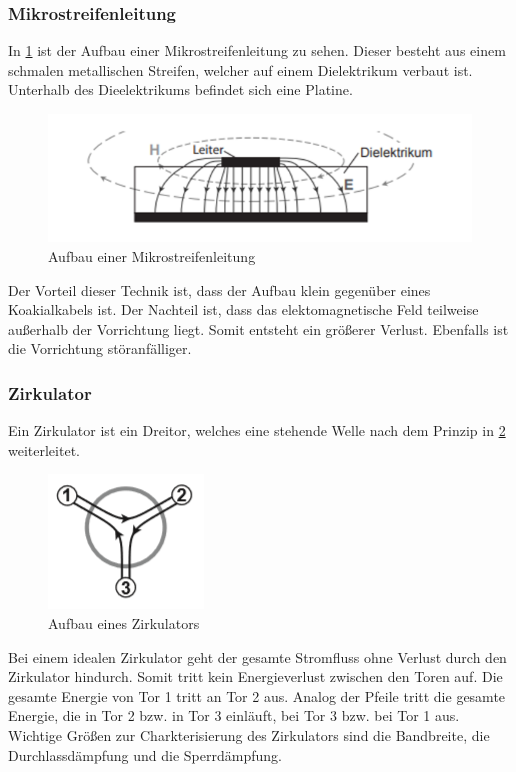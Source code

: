\subsubsection{Mikrostreifenleitung}
In \cref{Mikrostreifen} ist der Aufbau einer Mikrostreifenleitung zu sehen. Dieser besteht aus einem schmalen metallischen Streifen, welcher auf einem Dielektrikum verbaut ist. Unterhalb des Dieelektrikums befindet sich eine Platine.
\begin{figure}[h!]
	\centering
	\includegraphics[scale = 1]{mikrostreifen.png}
	\caption{Aufbau einer Mikrostreifenleitung}
	\label{Mikrostreifen}
\end{figure}
Der Vorteil dieser Technik ist, dass der Aufbau klein gegenüber eines Koakialkabels ist. Der Nachteil ist, dass das elektomagnetische Feld teilweise außerhalb der Vorrichtung liegt. Somit entsteht ein größerer Verlust. Ebenfalls ist die Vorrichtung störanfälliger.

\subsubsection{Zirkulator}
Ein Zirkulator ist ein Dreitor, welches eine stehende Welle nach dem Prinzip in \cref{ZB} weiterleitet.
\begin{figure}[h!]
	\centering
	\includegraphics[scale = 1]{Zirk-Bild.PNG}
	\caption{Aufbau eines Zirkulators}
	\label{ZB}
\end{figure}
Bei einem idealen Zirkulator geht der gesamte Stromfluss ohne Verlust  durch den Zirkulator hindurch. Somit tritt kein Energieverlust zwischen den Toren auf. Die gesamte Energie von Tor 1 tritt an Tor 2 aus. Analog der Pfeile tritt die gesamte Energie, die in Tor 2 bzw. in Tor 3 einläuft, bei Tor 3 bzw. bei Tor 1 aus. Wichtige Größen zur Charkterisierung des Zirkulators sind die Bandbreite, die Durchlassdämpfung und die Sperrdämpfung.

